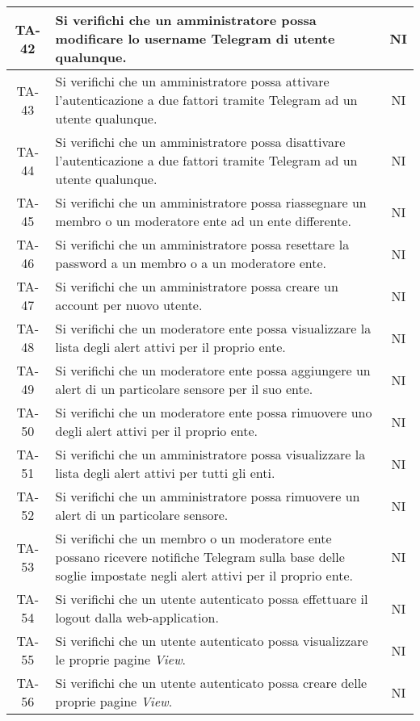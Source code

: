 \begin{center}
\begin{longtable}{|c|p{10cm}|c|}
			 \hline
			 TA-42 & Si verifichi che un amministratore possa modificare lo username Telegram di utente qualunque. & NI \\
			 \hline
			 TA-43 & Si verifichi che un amministratore possa attivare l'autenticazione a due fattori tramite Telegram ad un utente qualunque. & NI \\
			 \hline
			 TA-44 & Si verifichi che un amministratore possa disattivare l'autenticazione a due fattori tramite Telegram ad un utente qualunque. & NI \\
			 \hline
			 TA-45 & Si verifichi che un amministratore possa riassegnare un membro o un moderatore ente ad un ente differente. & NI \\
			 \hline
			 TA-46 & Si verifichi che un amministratore possa resettare la password a un membro o a un moderatore ente. & NI \\
			 \hline
			 TA-47 & Si verifichi che un amministratore possa creare un account per nuovo utente. & NI \\
			 \hline
			 TA-48 & Si verifichi che un moderatore ente possa visualizzare la lista degli alert attivi per il proprio ente. & NI \\
			 \hline
			 TA-49 & Si verifichi che un moderatore ente possa aggiungere un alert di un particolare sensore per il suo ente. & NI \\
			 \hline
			 TA-50 & Si verifichi che un moderatore ente possa rimuovere uno degli alert attivi per il proprio ente. & NI \\
			 \hline
			 TA-51 & Si verifichi che un amministratore possa visualizzare la lista degli alert attivi per tutti gli enti. & NI \\
			 \hline
			 TA-52 & Si verifichi che un amministratore possa rimuovere un alert di un particolare sensore. & NI \\
			 \hline
			 TA-53 & Si verifichi che un membro o un moderatore ente possano ricevere notifiche Telegram sulla base delle soglie impostate negli alert attivi per il proprio ente. & NI \\
			 \hline
			 TA-54 & Si verifichi che un utente autenticato possa effettuare il logout dalla web-application. & NI \\
			 \hline
			 TA-55 & Si verifichi che un utente autenticato possa visualizzare le proprie pagine \textit{View}. & NI \\
			 \hline
			 TA-56 & Si verifichi che un utente autenticato possa creare delle proprie pagine \textit{View}. & NI \\

\end{longtable}
\end{center}
